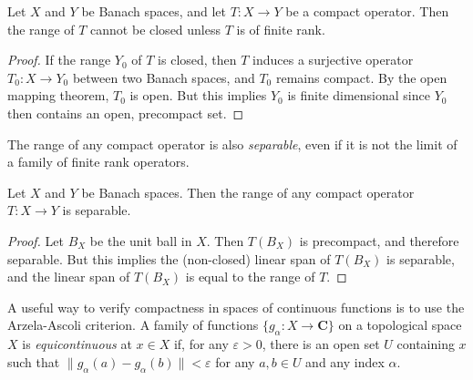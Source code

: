\begin{lemma}
    Let $X$ and $Y$ be Banach spaces, and let $T: X \to Y$ be a compact operator. Then the range of $T$ cannot be closed unless $T$ is of finite rank.
\end{lemma}
\begin{proof}
    If the range $Y_0$ of $T$ is closed, then $T$ induces a surjective operator $T_0: X \to Y_0$ between two Banach spaces, and $T_0$ remains compact. By the open mapping theorem, $T_0$ is open. But this implies $Y_0$ is finite dimensional since $Y_0$ then contains an open, precompact set.
\end{proof}

The range of any compact operator is also \emph{separable}, even if it is not the limit of a family of finite rank operators.

\begin{lemma}
    Let $X$ and $Y$ be Banach spaces. Then the range of any compact operator $T: X \to Y$ is separable.
\end{lemma}
\begin{proof}
    Let $B_X$ be the unit ball in $X$. Then $T(B_X)$ is precompact, and therefore separable. But this implies the (non-closed) linear span of $T(B_X)$ is separable, and the linear span of $T(B_X)$ is equal to the range of $T$.
\end{proof}

A useful way to verify compactness in spaces of continuous functions is to use the Arzela-Ascoli criterion. A family of functions $\{ g_\alpha : X \to \mathbf{C} \}$ on a topological space $X$ is \emph{equicontinuous} at $x \in X$ if, for any $\varepsilon > 0$, there is an open set $U$ containing $x$ such that $\| g_\alpha(a) - g_\alpha(b) \| < \varepsilon$ for any $a,b \in U$ and any index $\alpha$.

